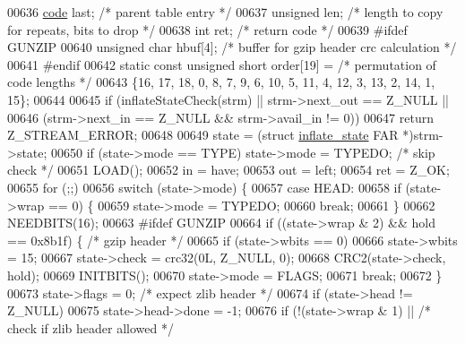 \begin{DoxyCode}
{{{{00636     \hyperlink{structcode}{code} last;                  \textcolor{comment}{/* parent table entry */}
00637     \textcolor{keywordtype}{unsigned} len;               \textcolor{comment}{/* length to copy for repeats, bits to drop */}
00638     \textcolor{keywordtype}{int} ret;                    \textcolor{comment}{/* return code */}
00639 \textcolor{preprocessor}{#ifdef GUNZIP}
00640     \textcolor{keywordtype}{unsigned} \textcolor{keywordtype}{char} hbuf[4];      \textcolor{comment}{/* buffer for gzip header crc calculation */}
00641 \textcolor{preprocessor}{#endif}
00642     \textcolor{keyword}{static} \textcolor{keyword}{const} \textcolor{keywordtype}{unsigned} \textcolor{keywordtype}{short} order[19] = \textcolor{comment}{/* permutation of code lengths */}
00643         \{16, 17, 18, 0, 8, 7, 9, 6, 10, 5, 11, 4, 12, 3, 13, 2, 14, 1, 15\};
00644 
00645     \textcolor{keywordflow}{if} (inflateStateCheck(strm) || strm->next\_out == Z\_NULL ||
00646         (strm->next\_in == Z\_NULL && strm->avail\_in != 0))
00647         \textcolor{keywordflow}{return} Z\_STREAM\_ERROR;
00648 
00649     state = (\textcolor{keyword}{struct }\hyperlink{structinflate__state}{inflate\_state} FAR *)strm->state;
00650     if (state->mode == TYPE) state->mode = TYPEDO;      \textcolor{comment}{/* skip check */}
00651     LOAD();
00652     in = have;
00653     out = left;
00654     ret = Z\_OK;
00655     \textcolor{keywordflow}{for} (;;)
00656         \textcolor{keywordflow}{switch} (state->mode) \{
00657         \textcolor{keywordflow}{case} HEAD:
00658             \textcolor{keywordflow}{if} (state->wrap == 0) \{
00659                 state->mode = TYPEDO;
00660                 \textcolor{keywordflow}{break};
00661             \}
00662             NEEDBITS(16);
00663 \textcolor{preprocessor}{#ifdef GUNZIP}
00664             \textcolor{keywordflow}{if} ((state->wrap & 2) && hold == 0x8b1f) \{  \textcolor{comment}{/* gzip header */}
00665                 \textcolor{keywordflow}{if} (state->wbits == 0)
00666                     state->wbits = 15;
00667                 state->check = crc32(0L, Z\_NULL, 0);
00668                 CRC2(state->check, hold);
00669                 INITBITS();
00670                 state->mode = FLAGS;
00671                 \textcolor{keywordflow}{break};
00672             \}
00673             state->flags = 0;           \textcolor{comment}{/* expect zlib header */}
00674             \textcolor{keywordflow}{if} (state->head != Z\_NULL)
00675                 state->head->done = -1;
00676             \textcolor{keywordflow}{if} (!(state->wrap & 1) ||   \textcolor{comment}{/* check if zlib header allowed */}
}}}}
\end{DoxyCode}
